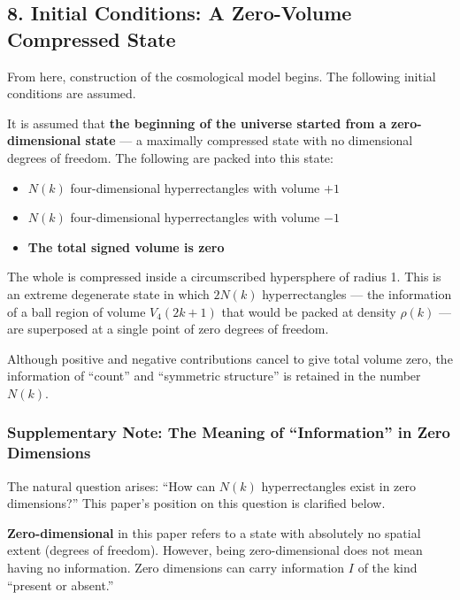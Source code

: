 \documentclass[a4paper,11pt]{article}
\theoremstyle{definition}
\providecommand{\tightlist}{\setlength{\itemsep}{0pt}\setlength{\parskip}{0pt}}
\begin{document}
\subsection{8. Initial Conditions: A Zero-Volume Compressed
State}\label{initial-conditions-a-zero-volume-compressed-state}

From here, construction of the cosmological model begins. The following
initial conditions are assumed.

It is assumed that \textbf{the beginning of the universe started from a
zero-dimensional state} --- a maximally compressed state with no
dimensional degrees of freedom. The following are packed into this
state:

\begin{itemize}
\tightlist
\item
  \(N(k)\) four-dimensional hyperrectangles with volume \(+1\)
\item
  \(N(k)\) four-dimensional hyperrectangles with volume \(-1\)
\item
  \textbf{The total signed volume is zero}
\end{itemize}

The whole is compressed inside a circumscribed hypersphere of radius 1.
This is an extreme degenerate state in which \(2N(k)\) hyperrectangles
--- the information of a ball region of volume \(V_4(2k+1)\) that would
be packed at density \(\rho(k)\) --- are superposed at a single point of
zero degrees of freedom.

Although positive and negative contributions cancel to give total volume
zero, the information of ``count'' and ``symmetric structure'' is
retained in the number \(N(k)\).

\subsubsection{Supplementary Note: The Meaning of ``Information'' in
Zero
Dimensions}\label{supplementary-note-the-meaning-of-information-in-zero-dimensions}

The natural question arises: ``How can \(N(k)\) hyperrectangles exist in
zero dimensions?'' This paper's position on this question is clarified
below.

\textbf{Zero-dimensional} in this paper refers to a state with
absolutely no spatial extent (degrees of freedom). However, being
zero-dimensional does not mean having no information. Zero dimensions
can carry information \(I\) of the kind ``present or absent.''
\end{document}
